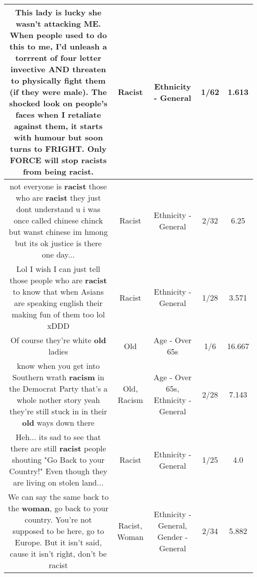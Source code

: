 \documentclass[11pt]{article}
\newlength\mylength
\begin{document}
\begin{center}
\begin{longtable}{|C{.65\mylength}|C{.30\mylength}|C{.12\mylength}|C{.12\mylength}|C{.12\mylength}|}
  \small This lady is lucky she wasn't attacking ME. When people used to do this to me, I'd unleash a torrrent of four letter invective AND threaten to physically fight them (if they were male). The shocked look on people's faces when I retaliate against them, it starts with humour but soon turns to FRIGHT. Only FORCE will stop racists from being \textbf{racist}.\normalsize   & Racist & Ethnicity - General & 1/62 & 1.613 \\  \hline
  \small not everyone is \textbf{racist} those who are \textbf{racist} they just dont understand u i was once called chinese chinck but wanst chinese im hmong but its ok justice is there one day...\normalsize   & Racist & Ethnicity - General & 2/32 & 6.25 \\  \hline
  \small Lol I wish I can just tell those people who are \textbf{racist} to know that when Asians are speaking english their making fun of them too lol xDDD\normalsize   & Racist & Ethnicity - General & 1/28 & 3.571 \\  \hline
  \small Of course they're white \textbf{old} ladies\normalsize   & Old & Age - Over 65s & 1/6 & 16.667 \\  \hline
  \small know when you get into Southern wrath \textbf{racism} in the Democrat Party that's a whole nother story yeah they're still stuck in in their \textbf{old} ways down there\normalsize   & Old, Racism & Age - Over 65s, Ethnicity - General & 2/28 & 7.143 \\  \hline
  \small Heh... its sad to see that there are still \textbf{racist} people shouting  "Go Back to your Country!" Even though they are living on stolen land...\normalsize   & Racist & Ethnicity - General & 1/25 & 4.0 \\  \hline
  \small We can say the same back to the \textbf{woman}, go back to your country. You're not supposed to be here, go to Europe. But it isn't said, cause it isn't right, don't be racist\normalsize   & Racist, Woman & Ethnicity - General, Gender - General & 2/34 & 5.882 \\  \hline

\end{longtable}
\end{center}
\end{document}

